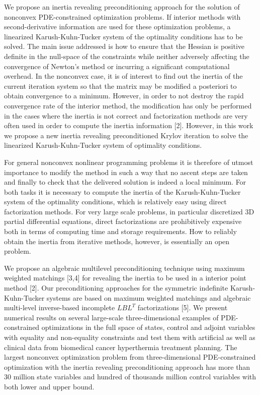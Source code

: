 \documentclass{report}
\begin{document}
We propose an inertia revealing preconditioning approach for the solution of
nonconvex PDE-constrained optimization problems. If interior methods with
second-derivative information are used for these optimization problems, a
linearized Karush-Kuhn-Tucker system of the optimality conditions has to be
solved. The main issue addressed is how to ensure that the Hessian is
positive definite in the null-space of the constraints while neither
adversely affecting the convergence of Newton's method or incurring a
significant computational overhead. In the nonconvex case, it is of
interest to find out the inertia of the current iteration system so that the
matrix may be modified a posteriori to obtain convergence to a minimum.
However, in order to not destroy the rapid convergence rate of the interior
method, the modification has only be performed in the cases where the
inertia is not correct and factorization methods are very often used in
order to compute the inertia information [2]. However, in this work we
propose a new inertia revealing preconditioned Krylov iteration to solve the
linearized Karush-Kuhn-Tucker system of optimality conditions.

For general nonconvex nonlinear programming problems it is therefore of
utmost importance to modify the method in such a way that no ascent steps
are taken and finally to check that the delivered solution is indeed a local
minimum. For both tasks it is necessary to compute the inertia of the
Karush-Kuhn-Tucker system of the optimality conditions, which is relatively
easy using direct factorization methods. For very large scale problems, in
particular discretized 3D partial differential equations, direct
factorizations are prohibitively expensive both in terms of computing time
and storage requirements. How to reliably obtain the inertia from iterative
methods, however, is essentially an open problem.

We propose an algebraic multilevel preconditioning technique using maximum
weighted matchings [3,4] for revealing the inertia to be used in a interior
point method [2]. Our preconditioning approaches for the symmetric
indefinite Karush-Kuhn-Tucker systems are based on maximum weighted
matchings and algebraic multi-level inverse-based incomplete $LBL^T$
factorizations [5]. We present numerical results on several large-scale
three-dimensional examples of PDE-constrained optimizations in the full
space of states, control and adjoint variables with equality and
non-equality constraints and test them with artificial as well as clinical
data from biomedical cancer hyperthermia treatment planning. The largest
nonconvex optimization problem from three-dimensional PDE-constrained
optimization with the inertia revealing preconditioning approach has more
than 30 million state variables and hundred of thousands million control
variables with both lower and upper bound.
\end{document}

